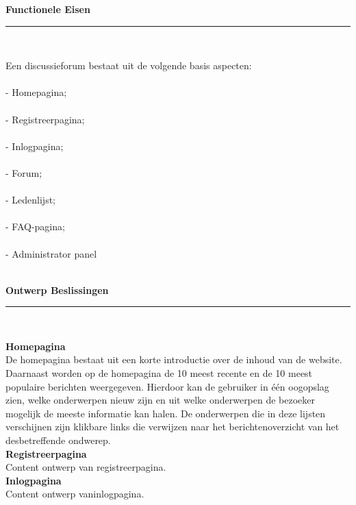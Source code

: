 \documentclass[a4paper,12pt]{article}
\newcommand{\HRule}{\rule{\linewidth}{0.5mm}}
\begin{document}
\newpage
\begin{center}
{ \LARGE \bfseries Functionele Eisen}\\[0.1cm]
\HRule \\[0.5cm]
\end{center}
Een discussieforum bestaat uit de volgende basis aspecten:\\\\
-	Homepagina;\\\\
-	Registreerpagina;\\\\
-	Inlogpagina;\\\\
-	Forum;\\\\
-	Ledenlijst;\\\\
-	FAQ-pagina;\\\\
-         Administrator panel\\\\




\newpage
\begin{center}
{ \LARGE \bfseries Ontwerp Beslissingen}\\[0.1cm]
\HRule \\[0.5cm]
\end{center}
{\bfseries Homepagina} \\
De homepagina bestaat uit een korte introductie over de inhoud van de website. Daarnaast worden op de homepagina de 10 meest recente en de 10 meest populaire berichten weergegeven. Hierdoor kan de gebruiker in één oogopslag zien, welke onderwerpen nieuw zijn en uit welke onderwerpen de bezoeker mogelijk de meeste informatie kan halen. De onderwerpen die in deze lijsten verschijnen zijn klikbare links die verwijzen naar het berichtenoverzicht van het desbetreffende ondwerep.\\



{\bfseries Registreerpagina}\\
Content ontwerp van registreerpagina.\\

{\bfseries Inlogpagina}\\
Content ontwerp vaninlogpagina.\\
\end{document}
